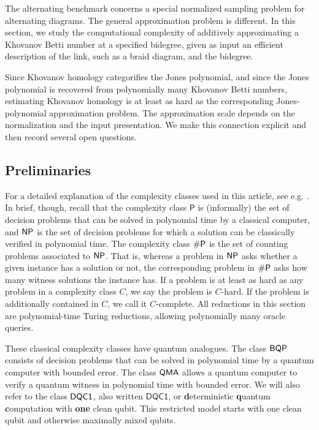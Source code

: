 \documentclass[a4paper,onecolumn,unpublished]{quantumarticle}
\theoremstyle{plain}
\theoremstyle{definition}
\theoremstyle{definition}
\numberwithin{equation}{section}
\begin{document}
The alternating benchmark concerns a special normalized sampling problem for alternating diagrams. The general approximation problem is different. In this section, we study the computational complexity of additively approximating a Khovanov Betti number at a specified bidegree, given as input an efficient description of the link, such as a braid diagram, and the bidegree.

Since Khovanov homology categorifies the Jones polynomial, and since the Jones polynomial is recovered from polynomially many Khovanov Betti numbers, estimating Khovanov homology is at least as hard as the corresponding Jones-polynomial approximation problem. The approximation scale depends on the normalization and the input presentation. We make this connection explicit and then record several open questions.

\subsection{Preliminaries}
\label{sec:complex_prelim}
\label{sec:complexity_lower}

For a detailed explanation of the complexity classes used in this article, see e.g. \cite{bernstein1993quantum,watrous2009quantum}. In brief, though, recall that the complexity class \(\mathsf{P}\) is (informally) the set of decision problems that can be solved in polynomial time by a classical computer, and \(\mathsf{NP}\) is the set of decision problems for which a solution can be classically verified in polynomial time. The complexity class \(\#\mathsf{P}\) is the set of counting problems associated to \(\mathsf{NP}\). That is, whereas a problem in \(\mathsf{NP}\) asks whether a given instance has a solution or not, the corresponding problem in \(\#\mathsf{P}\) asks how many witness solutions the instance has. If a problem is at least as hard as any problem in a complexity class \(C\), we say the problem is \(C\)-hard. If the problem is additionally contained in \(C\), we call it \(C\)-complete. All reductions in this section are polynomial-time Turing reductions, allowing polynomially many oracle queries.

These classical complexity classes have quantum analogues. The class \(\mathsf{BQP}\) consists of decision problems that can be solved in polynomial time by a quantum computer with bounded error. The class \(\mathsf{QMA}\) allows a quantum computer to verify a quantum witness in polynomial time with bounded error. We will also refer to the class \(\mathsf{DQC1}\), also written \(\mathsf{DQC1}\), or \textbf{d}eterministic \textbf{q}uantum \textbf{c}omputation with \textbf{one} clean qubit. This restricted model starts with one clean qubit and otherwise maximally mixed qubits.
\end{document}
